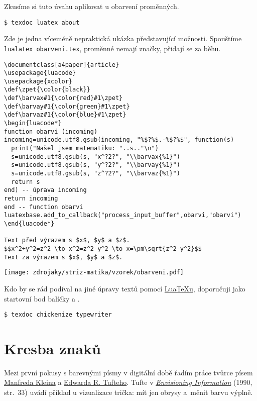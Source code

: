 Zkusíme si tuto úvahu aplikovat u obarvení proměnných.
\begin{lstlisting}
$ texdoc luatex about
\end{lstlisting}

Zde je jedna víceméně nepraktická ukázka představující možnosti. Spouštíme \texttt{lualatex obarveni.tex}, proměnné nemají značky, přidají se za běhu.

\begin{lstlisting}[basicstyle=\fontsize{8}{9}\selectfont\ttfamily]
\documentclass[a4paper]{article}
\usepackage{luacode}
\usepackage{xcolor}
\def\zpet{\color{black}}
\def\barvax#1{\color{red}#1\zpet}
\def\barvay#1{\color{green}#1\zpet}
\def\barvaz#1{\color{blue}#1\zpet}
\begin{luacode*}
function obarvi (incoming)
incoming=unicode.utf8.gsub(incoming, "%$?%$.-%$?%$", function(s)
  print("Našel jsem matematiku: "..s.."\n")
  s=unicode.utf8.gsub(s, "x^?2?", "\\barvax{%1}")
  s=unicode.utf8.gsub(s, "y^?2?", "\\barvay{%1}")
  s=unicode.utf8.gsub(s, "z^?2?", "\\barvaz{%1}")
  return s
end) -- úprava incoming
return incoming
end -- function obarvi
luatexbase.add_to_callback("process_input_buffer",obarvi,"obarvi")
\end{luacode*}

Text před výrazem s $x$, $y$ a $z$.
$$x^2+y^2=z^2 \to x^2=z^2-y^2 \to x=\pm\sqrt{z^2-y^2}$$
Text za výrazem s $x$, $y$ a $z$.

\end{lstlisting}

\noindent
\texttt{[image: zdrojaky/striz-matika/vzorek/obarveni.pdf]}

Kdo by se rád podíval na jiné úpravy textů pomocí \href{http://luatex.org/}{Lua\TeX u}, doporučuji jako startovní bod balíčky \href{https://ctan.org/pkg/chickenize}{} a \href{https://ctan.org/pkg/typewriter}{}.
\begin{lstlisting}
$ texdoc chickenize typewriter
\end{lstlisting}



\section{Kresba znaků}
Mezi první pokusy s barevnými písmy v digitální době řadím práce tvůrce písem \href{http://luc.devroye.org/klein.html}{Manfreda Kleina} a \href{https://www.edwardtufte.com/tufte/}{Edwarda R. Tufteho}. 
Tufte v \href{https://www.edwardtufte.com/tufte/books_ei}{\textit{Envisioning Information}} (1990, str.~33) uvádí příklad u vizualizace trička: mít jen obrysy a~měnit barvu výplně. 

